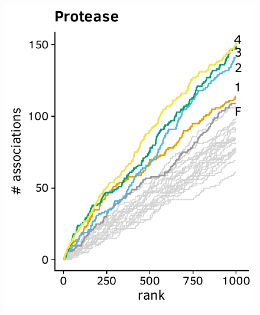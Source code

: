 \documentclass[a4paper,11pt]{article}
\begin{document}
\begin{figure}[H]
\begin{minipage}{.49\textwidth}
      \includegraphics[width=\linewidth]{plots/comparison_plots/arevir/protease_new_map.pdf}
    \end{minipage}
  
    \vspace{0.5cm}
  

\end{figure}
\end{document}
